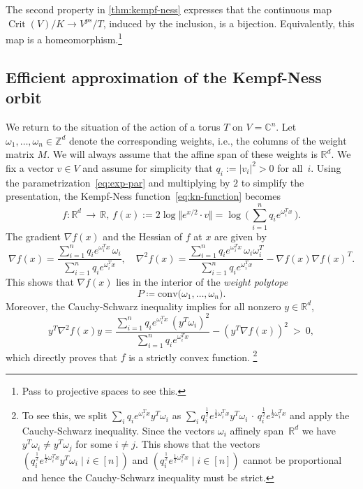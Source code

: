 \documentclass[a4paper,USenglish,cleveref,numberwithinsect]{lipics-v2021}
\DeclareMathOperator{\Crit}{Crit}
\newcommand{\CC}{\mathbb{C}}
\newcommand{\ZZ}{\mathbb{Z}}
\newcommand{\RR}{\mathbb{R}}
\numberwithin{equation}{section}
\begin{document}
\begin{remark}
The second property in \cref{thm:kempf-ness} expresses that the continuous map $\Crit(V)/K \to V^{ps}/T$,
induced by the inclusion, is a bijection.
Equivalently,  this map is a homeomorphism.\footnote{Pass to projective spaces to see this.}
\end{remark}



\subsection{Efficient approximation of the Kempf-Ness orbit}\label{sec:EA-KN0}
We return to the situation of the action of a torus $T$ on $V=\CC^n$.
Let $\omega_1,\ldots,\omega_n\in\ZZ^d$ denote the corresponding weights,
i.e., the columns of the weight matrix $M$.
We will always assume that the affine span of these weights is $\RR^d$.
We fix a vector $v\in V$ and assume for simplicity that
$q_i := |v_i|^2 > 0$ for all~$i$.
Using the parametrization~\eqref{eq:exp-par} and multiplying by $2$ to simplify the presentation,
the Kempf-Ness function~\eqref{eq:kn-function} becomes
\begin{equation}\label{eq:def-kn-func}
	f \colon \RR^d \, \rightarrow \, \RR, \, f(x) := 2\log \Vert e^{x/2}\cdot v\Vert
   = \log\,\Big(\,\sum_{i=1}^n q_i e^{\omega_i^T x} \,\Big) .
\end{equation}
The gradient $\nabla f(x)$ and the Hessian of $f$ at $x$ are given by
\begin{equation}
\label{eq:grad-of-kn-func}
  \nabla f(x) = \frac{\sum_{i=1}^n q_i   e^{\omega_i^T x}\, \omega_i }{\sum_{i=1}^n q_i  e^{\omega_i^T x}}, \quad
 \nabla^2 f(x) = \frac{\sum_{i=1}^n q_i   e^{\omega_i^T x}\, \omega_i\omega_i^T }{\sum_{i=1}^n q_i  e^{\omega_i^T x} }
          - \nabla f(x) \nabla f(x)^T .
\end{equation}
This shows that $\nabla f(x)$ lies in the interior of the \textit{weight polytope}
\[
 P \coloneqq  \mathrm{conv}\big(\omega_1,\ldots,  \omega_n\big) .
\]
Moreover, the Cauchy-Schwarz inequality implies for all nonzero $y\in\RR^d$,
\begin{equation}\label{eq:yHyT}
 y^T\nabla^2 f(x) y= \frac{\sum_{i=1}^n q_i   e^{\omega_i^T x}\, (y^T\omega_i)^2 }{\sum_{i=1}^n q_i  e^{\omega_i^T x} }
          -  (y^T\nabla f(x))^2 \ >\  0 ,
\end{equation}
which directly proves that $f$ is a strictly convex function.%
\footnote{To see this, we split $\sum_i q_i e^{\omega_i^T x} y^T \omega_i$ as $\sum_i q_i^{\frac{1}{2}}e^{\frac{1}{2}\omega_i^T x}y^T \omega_i \, \cdot \, q_i^{\frac{1}{2}}e^{\frac{1}{2}\omega_i^T x}$ and apply the Cauchy-Schwarz inequality. Since the vectors $\omega_i$ affinely span~$\RR^d$ we have $y^T\omega_i\neq y^T\omega_j$ for some $i\neq j$.
This shows that the vectors $(q_i^{\frac{1}{2}}e^{\frac{1}{2}\omega_i^T x}y^T\omega_i\mid i\in [n])$ and $(q_i^{\frac{1}{2}}e^{\frac{1}{2}\omega_i^T x}\mid i\in [n])$ cannot be proportional and hence the Cauchy-Schwarz inequality must be strict.
}
\end{document}
